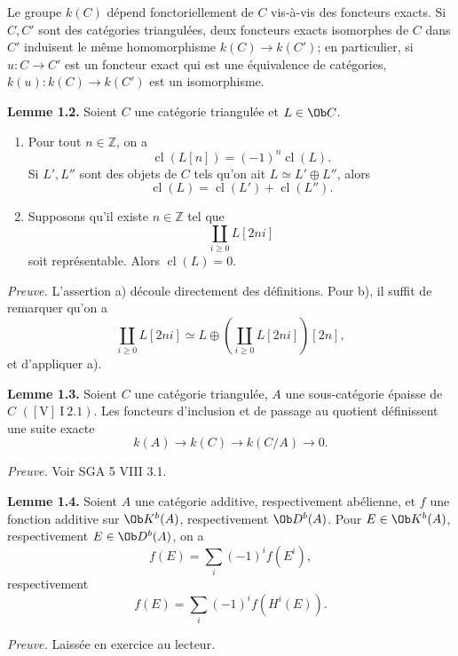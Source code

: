 \documentclass[11pt]{article}
\newcommand{\cl}{\operatorname{cl}}
\begin{document}
Le groupe \(k(C)\) dépend fonctoriellement de \(C\) vis-à-vis des foncteurs exacts. Si \(C,C'\) sont des catégories triangulées, deux foncteurs exacts isomorphes de \(C\) dans \(C'\) induisent le même homomorphisme \(k(C)\to k(C')\); en particulier, si \(u:C\to C'\) est un foncteur exact qui est une équivalence de catégories, \(k(u):k(C)\to k(C')\) est un isomorphisme.

\textbf{Lemme 1.2.} Soient \(C\) une catégorie triangulée et \(L\in\Ob C\).
\begin{enumerate}[label=\alph*)]
\item Pour tout \(n\in\mathbb Z\), on a
\[
 \cl(L[n])=(-1)^n\cl(L).
\]
Si \(L',L''\) sont des objets de \(C\) tels qu'on ait \(L\simeq L'\oplus L''\), alors
\[
 \cl(L)=\cl(L')+\cl(L'').
\]
\item Supposons qu'il existe \(n\in\mathbb Z\) tel que
\[
 \coprod_{i\geq0} L[2ni]
\]
soit représentable. Alors \(\cl(L)=0\).
\end{enumerate}

\emph{Preuve.} L'assertion a) découle directement des définitions. Pour b), il suffit de remarquer qu'on a
\[
 \coprod_{i\geq0} L[2ni]\simeq
 L\oplus\left(\coprod_{i\geq0}L[2ni]\right)[2n],
\]
et d'appliquer a).

\textbf{Lemme 1.3.} Soient \(C\) une catégorie triangulée, \(A\) une sous-catégorie épaisse de \(C\) \(([\mathrm V]\ \mathrm I\ 2.1)\). Les foncteurs d'inclusion et de passage au quotient définissent une suite exacte
\[
 k(A)\longrightarrow k(C)\longrightarrow k(C/A)\longrightarrow 0.
\]

\emph{Preuve.} Voir SGA 5 VIII 3.1.

\textbf{Lemme 1.4.} Soient \(A\) une catégorie additive, respectivement abélienne, et \(f\) une fonction additive sur \(\Ob K^b(A)\), respectivement \(\Ob D^b(A)\). Pour \(E\in\Ob K^b(A)\), respectivement \(E\in\Ob D^b(A)\), on a
\[
 f(E)=\sum_i(-1)^i f(E^i),
\]
respectivement
\[
 f(E)=\sum_i(-1)^i f(H^i(E)).
\]

\emph{Preuve.} Laissée en exercice au lecteur.
\end{document}
